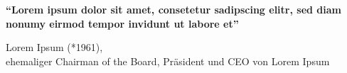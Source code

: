 \vspace*{5cm}

\begin{center}
    \textbf{"`Lorem ipsum dolor sit amet, consetetur sadipscing elitr, sed diam nonumy eirmod tempor invidunt ut labore et"'\\}
\end{center}
 Lorem Ipsum (*1961),\\ ehemaliger Chairman of the Board, Präsident und CEO von Lorem Ipsum

\vspace*{1cm}
\noindent 
